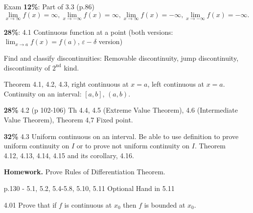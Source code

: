 \begin{enumerate}
   \item[Exam] \textbf{12\%}: Part of 3.3 (p.86)
               $$\lim_{x\rightarrow\infty}f(x) = \infty,
                 \lim_{x\rightarrow-\infty}f(x) = \infty,
                 \lim_{x\rightarrow\infty}f(x) = -\infty,
                 \lim_{x\rightarrow-\infty}f(x) = -\infty.$$
                 
               \textbf{28\%}: 4.1 Continuous function at a point (both versions:
               $\lim_{x\rightarrow a}f(x) = f(a)$, $\varepsilon-\delta$ version)
               
               Find and classify discontinuities: Removable discontinuity,
               jump discontinuity, discontinuity of $2^{\text{nd}}$ kind.
               
               Theorem 4.1, 4.2, 4.3, right continuous at $x = a$, left
               continuous at $x = a$. Continuity on an interval: $[a, b]$,
               $(a, b)$.
               
               
               \textbf{28\%} 4.2 (p 102-106) Th 4.4, 4.5
               (Extreme Value Theorem), 4.6 (Intermediate Value Theorem),
               Theorem 4,7 Fixed point.
               
               \textbf{32\%} 4.3 Uniform continuous on an interval. Be able to
               use definition to prove uniform continuity on  $I$ or to prove
               not uniform continuity on $I$. Theorem 4.12, 4.13, 4.14, 4.15
               and its corollary, 4.16.
               
               \textbf{Homework.} Prove Rules of Differentiation Theorem.
               
               p.130 - 5.1, 5.2, 5.4-5.8, 5.10, 5.11 Optional Hand in 5.11
   \item[4.01] Prove that if $f$ is continuous at $x_0$ then $f$ is bounded at
               $x_0$.


\end{enumerate}
